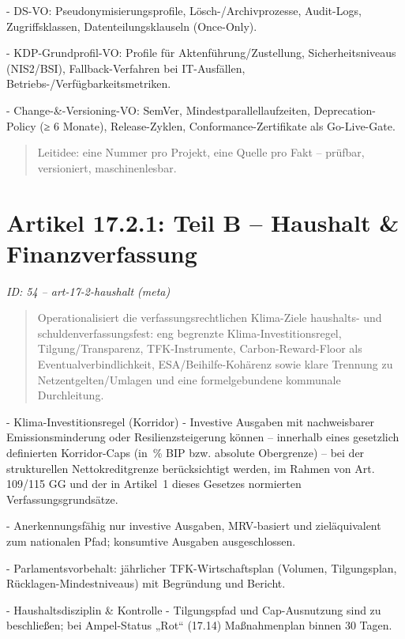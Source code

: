 \documentclass[12pt,a4paper]{scrartcl}
\begin{document}
- DS-VO: Pseudonymisierungsprofile, Lösch-/Archivprozesse, Audit-Logs, Zugriffsklassen, Datenteilungsklauseln (Once-Only).

- KDP-Grundprofil-VO: Profile für Aktenführung/Zustellung, Sicherheitsniveaus (NIS2/BSI), Fallback-Verfahren bei IT-Ausfällen, Betriebs-/Verfügbarkeitsmetriken.

- Change-\&-Versioning-VO: SemVer, Mindestparallellaufzeiten, Deprecation-Policy (≥ 6 Monate), Release-Zyklen, Conformance-Zertifikate als Go-Live-Gate.

{\footnotesize\begin{quote}
Leitidee: eine Nummer pro Projekt, eine Quelle pro Fakt -- prüfbar, versioniert, maschinenlesbar.
\end{quote}}



\section[Artikel 17.2.1: Teil B -- Haushalt \& Finanzverfassung]{Artikel 17.2.1: Teil B -- Haushalt \& Finanzverfassung}
\noindent\textit{ID: 54 -- art-17-2-haushalt (meta)}

\begin{quote}
Operationalisiert die verfassungsrechtlichen Klima-Ziele haushalts- und schuldenverfassungsfest: eng begrenzte Klima-Investitionsregel, Tilgung/Transparenz, TFK-Instrumente, Carbon-Reward-Floor als Eventualverbindlichkeit, ESA/Beihilfe-Kohärenz sowie klare Trennung zu Netzentgelten/Umlagen und eine formelgebundene kommunale Durchleitung.
\end{quote}

- Klima-Investitionsregel (Korridor)
- Investive Ausgaben mit nachweisbarer Emissionsminderung oder Resilienzsteigerung können -- innerhalb eines gesetzlich definierten Korridor-Caps (in \% BIP bzw. absolute Obergrenze) -- bei der strukturellen Nettokreditgrenze berücksichtigt werden, im Rahmen von Art. 109/115 GG und der in Artikel 1 dieses Gesetzes normierten Verfassungsgrundsätze.

- Anerkennungsfähig nur investive Ausgaben, MRV-basiert und zieläquivalent zum nationalen Pfad; konsumtive Ausgaben ausgeschlossen.

- Parlamentsvorbehalt: jährlicher TFK-Wirtschaftsplan (Volumen, Tilgungsplan, Rücklagen-Mindestniveaus) mit Begründung und Bericht.

- Haushaltsdisziplin \& Kontrolle
- Tilgungspfad und Cap-Ausnutzung sind zu beschließen; bei Ampel-Status „Rot“ (17.14) Maßnahmenplan binnen 30 Tagen.
\end{document}
